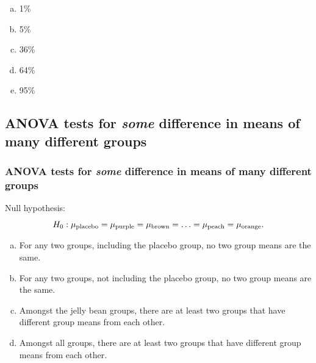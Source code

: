 \documentclass[11pt,containsverbatim,handout,xcolor=xelatex,dvipsnames,table]{beamer}
\newcommand{\solnMult}[1]{#1}
\newcommand{\soln}[1]{}
\begin{document}

\begin{frame}
\frametitle{}
  

\begin{enumerate}[(a)]
\item 1\%
\item 5\%
\item 36\%
\item \solnMult{64\%} \onslide<2>{\soln{\red{$\rightarrow~1 - (1 - 0.05)^{20}$}}}
\item 95\%
\end{enumerate}
 
\end{frame}


\subsection{ANOVA tests for \emph{some} difference in means of many different groups}
\label{mi2}


\begin{frame}
  \frametitle{ANOVA tests for \emph{some} difference in means of many different groups}

Null hypothesis:
\[
H_0: \mu_{\textmd{placebo}} = \mu_{\textmd{purple}} = \mu_{\textmd{brown}} =
\ldots = \mu_{\textmd{peach}} = \mu_{\textmd{orange}} .
\]

\pause


\begin{enumerate}[(a)]
\item For any two groups, including the placebo group, no two group means are the same.
\item For any two groups, not including the placebo group, no two group means are the same.
\item Amongst the jelly bean groups, there are at least two groups that have different group means from each other.
\item \solnMult{Amongst all groups, there are at least two groups that have different group means from each other.}
\end{enumerate}

\end{frame}
\end{document}
